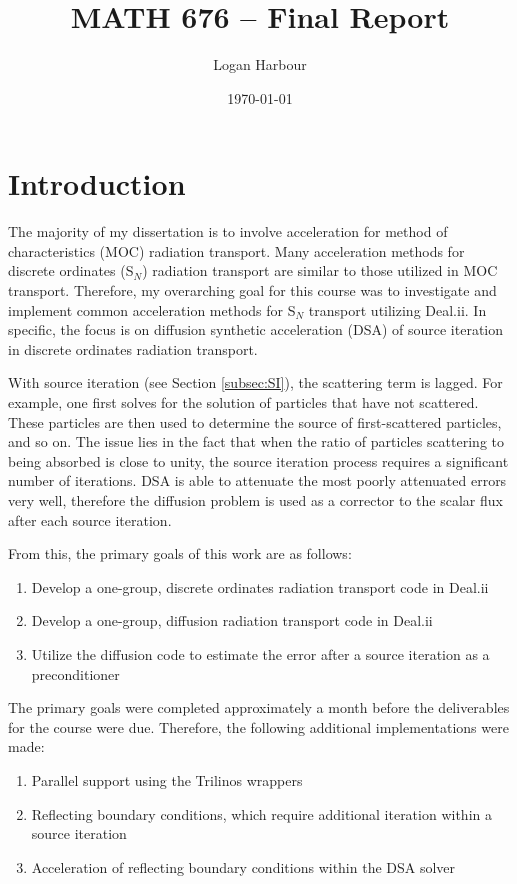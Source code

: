 \documentclass{article}
\newcommand{\pageTitle}{MATH 676 -- Final Report}
\newcommand{\pageAuthor}{Logan Harbour}
\begin{document}
\title{\LARGE \textbf{\pageTitle} \vspace{-0.3cm}}
\author{\large \pageAuthor}
\date{\vspace{-0.6cm} \large \today \vspace{-0.4cm}}

\maketitle

\section{Introduction}

The majority of my dissertation is to involve acceleration for method of characteristics (MOC) radiation transport. Many acceleration methods for discrete ordinates (S$_N$) radiation transport are similar to those utilized in MOC transport. Therefore, my overarching goal for this course was to investigate and implement common acceleration methods for S$_N$ transport utilizing Deal.ii. In specific, the focus is on diffusion synthetic acceleration (DSA) of source iteration \cite{adams2002fast} in discrete ordinates radiation transport.

With source iteration (see Section \ref{subsec:SI}), the scattering term is lagged. For example, one first solves for the solution of particles that have not scattered. These particles are then used to determine the source of first-scattered particles, and so on. The issue lies in the fact that when the ratio of particles scattering to being absorbed is close to unity, the source iteration process requires a significant number of iterations. DSA is able to attenuate the most poorly attenuated errors very well, therefore the diffusion problem is used as a corrector to the scalar flux after each source iteration.

From this, the primary goals of this work are as follows:
\begin{enumerate}
	\item Develop a one-group, discrete ordinates radiation transport code in Deal.ii
	\item Develop a one-group, diffusion radiation transport code in Deal.ii
	\item Utilize the diffusion code to estimate the error after a source iteration as a preconditioner
\end{enumerate}

The primary goals were completed approximately a month before the deliverables for the course were due. Therefore, the following additional implementations were made:
\begin{enumerate}
	\item Parallel support using the Trilinos wrappers
	\item Reflecting boundary conditions, which require additional iteration within a source iteration
	\item Acceleration of reflecting boundary conditions within the DSA solver
\end{enumerate}
\end{document}
